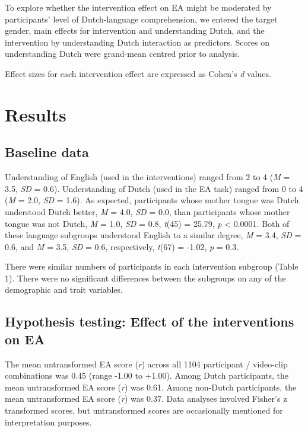 \documentclass[authordate, empirical, issue]{jote-new-article}
\begin{document}
To explore whether the intervention effect on EA might be moderated by participants' level of Dutch-language comprehension, we entered the target gender, main effects for intervention and understanding Dutch, and the intervention by understanding Dutch interaction as predictors. Scores on understanding Dutch were grand-mean centred prior to analysis.



Effect sizes for each intervention effect are expressed as Cohen's \emph{d} values.



\section{Results}



\subsection{Baseline data}



Understanding of English (used in the interventions) ranged from 2 to 4 (\emph{M} = 3.5, \emph{SD} = 0.6). Understanding of Dutch (used in the EA task) ranged from 0 to 4 (\emph{M} = 2.0, \emph{SD} = 1.6). As expected, participants whose mother tongue was Dutch understood Dutch better, \emph{M} = 4.0, \emph{SD} = 0.0, than participants whose mother tongue was not Dutch, \emph{M} = 1.0, \emph{SD} = 0.8, \emph{t}(45) = 25.79, \emph{p} < 0.0001. Both of these language subgroups understood English to a similar degree, \emph{M} = 3.4, \emph{SD} = 0.6, and \emph{M} = 3.5, \emph{SD} = 0.6, respectively, \emph{t}(67) = -1.02, \emph{p} = 0.3.



There were similar numbers of participants in each intervention subgroup (Table 1). There were no significant differences between the subgroups on any of the demographic and trait variables.



\subsection{Hypothesis testing: Effect of the interventions on EA}



The mean untransformed EA score (\emph{r}) across all 1104 participant / video-clip combinations was 0.45 (range -1.00 to +1.00). Among Dutch participants, the mean untransformed EA score (\emph{r}) was 0.61. Among non-Dutch participants, the mean untransformed EA score (\emph{r}) was 0.37. Data analyses involved Fisher's z transformed scores, but untransformed scores are occasionally mentioned for interpretation purposes.
\end{document}
